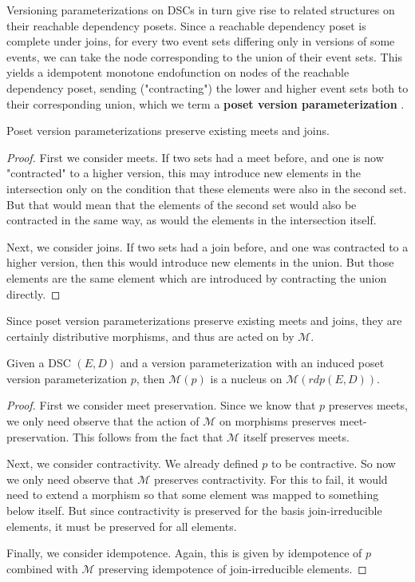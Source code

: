 \documentclass[hoptionsi,review,format=sigplan]{acmart}
\theoremstyle{definition}
\newcommand{\Mcc}{\mathcal{M}}
\begin{document}
Versioning parameterizations on DSCs in turn give rise to related structures on their reachable dependency posets. Since a reachable dependency poset is complete under joins, for every two event sets differing only in versions of some events, we can take the node corresponding to the union of their event sets. This yields a idempotent monotone endofunction on nodes of the reachable dependency poset, sending ("contracting") the lower and higher event sets both to their corresponding union, which we term a \textbf{poset version parameterization} . 

\begin{lemma}
Poset version parameterizations preserve existing meets and joins.
\end{lemma}
\begin{proof}
First we consider meets. If two sets had a meet before, and one is now "contracted" to a higher version, this may introduce new elements in the intersection only on the condition that these elements were also in the second set. But that would mean that the elements of the second set would also be contracted in the same way, as would the elements in the intersection itself.

Next, we consider joins. If two sets had a join before, and one was contracted to a higher version, then this would introduce new elements in the union. But those elements are the same element which are introduced by contracting the union directly.
\end{proof}

Since poset version parameterizations preserve existing meets and joins, they are certainly distributive morphisms, and thus are acted on by \(\Mcc\). 

\begin{theorem}
Given a DSC \((E,D)\) and a version parameterization with an induced poset version parameterization \(p\), then \(\Mcc(p)\) is a nucleus on \(\Mcc(rdp(E,D))\).
\end{theorem}
\begin{proof}
First we consider meet preservation. Since we know that \(p\) preserves meets, we only need observe that the action of \(\Mcc\) on morphisms preserves meet-preservation. This follows from the fact that \(\Mcc\) itself preserves meets.


Next, we consider contractivity. We already defined \(p\) to be contractive. So now we only need observe that \(\Mcc\) preserves contractivity. For this to fail, it would need to extend a morphism so that some element was mapped to something below itself. But since contractivity is preserved for the basis join-irreducible elements, it must be preserved for all elements.

Finally, we consider idempotence. Again, this is given by idempotence of \(p\) combined with \(\Mcc\) preserving idempotence of join-irreducible elements.
\end{proof}
\end{document}
